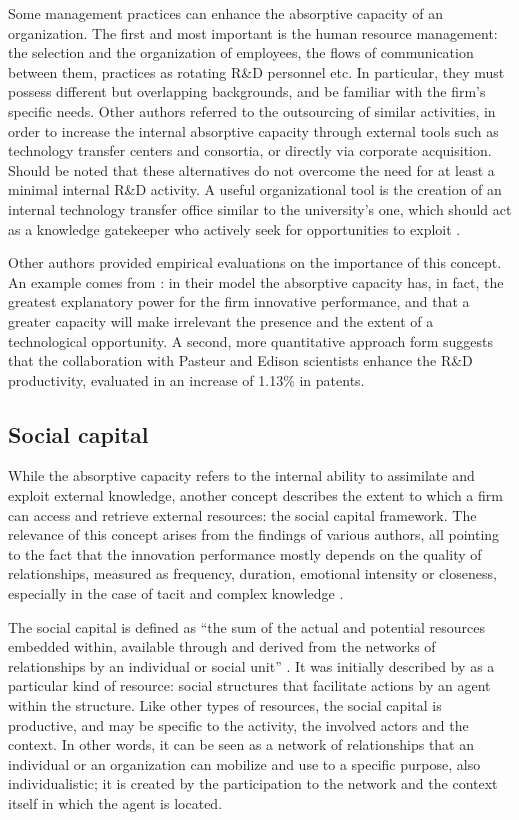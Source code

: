 Some management practices can enhance the absorptive capacity of an organization. The first and most important is the human resource management: the selection and the organization of employees, the flows of communication between them, practices as rotating R\&D personnel etc. In particular, they must possess different but overlapping backgrounds, and be familiar with the firm's specific needs. Other authors referred to the outsourcing of similar activities, in order to increase the internal absorptive capacity through external tools such as technology transfer centers and consortia, or directly via corporate acquisition. Should be noted that these alternatives do not overcome the need for at least a minimal internal R\&D activity. A useful organizational tool is the creation of an internal technology transfer office similar to the university's one, which should act as a knowledge gatekeeper who actively seek for opportunities to exploit \citep{Alexander2013}.

Other authors provided empirical evaluations on the importance of this concept. An example comes from \citet{Nieto2005}: in their model the absorptive capacity has, in fact, the greatest explanatory power for the firm innovative performance, and that a greater capacity will make irrelevant the presence and the extent of a technological opportunity. A second, more quantitative approach form \citet{Baba2009} suggests that the collaboration with Pasteur and Edison scientists enhance the R\&D productivity, evaluated in an increase of 1.13\% in patents.

\subsection{Social capital}

While the absorptive capacity refers to the internal ability to assimilate and exploit external knowledge, another concept describes the extent to which a firm can access and retrieve external resources: the social capital framework. The relevance of this concept arises from the findings of various authors, all pointing to the fact that the innovation performance mostly depends on the quality of relationships, measured as frequency, duration, emotional intensity or closeness, especially in the case of tacit and complex knowledge \citep{Perez-Luno2011}. 

The social capital is defined as \enquote{the sum of the actual and potential resources embedded within, available through and derived from the networks of relationships by an individual or social unit} \citep{Perez-Luno2011}. It was initially described by \citet{Coleman1988} as a particular kind of resource: social structures that facilitate actions by an agent within the structure. Like other types of resources, the social capital is productive, and may be specific to the activity, the involved actors and the context. In other words, it can be seen as a network of relationships that an individual or an organization can mobilize and use to a specific purpose, also individualistic; it is created by the participation to the network and the context itself in which the agent is located.

